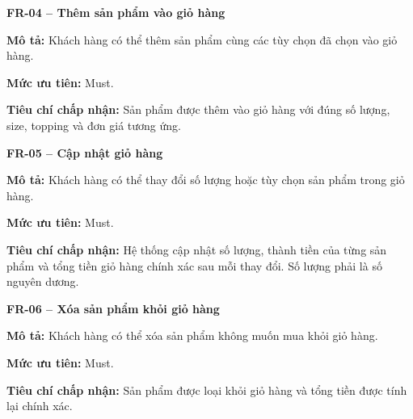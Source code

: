 \documentclass[a4paper]{article}
\begin{document}
\par\ifdim\dimexpr\pagegoal-\pagetotal\relax<6\baselineskip\newpage\fi
{}

\noindent\textbf{FR-04 – Thêm sản phẩm vào giỏ hàng}\par\nopagebreak
\begin{list}{}{%
    \setlength{\leftmargin}{0.8cm}%
    \setlength{\rightmargin}{0pt}%
    \setlength{\labelwidth}{0pt}%
    \setlength{\labelsep}{0pt}%
    \setlength{\itemindent}{0pt}%
    \setlength{\listparindent}{0pt}%
    \setlength{\itemsep}{5pt}%
    \setlength{\parsep}{0pt}%
    \setlength{\topsep}{5pt}%
}
\item[] \textbf{Mô tả:} Khách hàng có thể thêm sản phẩm cùng các tùy chọn đã chọn vào giỏ hàng.
\item[] \textbf{Mức ưu tiên:} Must.
\item[] \textbf{Tiêu chí chấp nhận:} Sản phẩm được thêm vào giỏ hàng với đúng số lượng, size, topping và đơn giá tương ứng.
\end{list}

\par\ifdim\dimexpr\pagegoal-\pagetotal\relax<6\baselineskip\newpage\fi
{}

\noindent\textbf{FR-05 – Cập nhật giỏ hàng}\par\nopagebreak
\begin{list}{}{%
    \setlength{\leftmargin}{0.8cm}%
    \setlength{\rightmargin}{0pt}%
    \setlength{\labelwidth}{0pt}%
    \setlength{\labelsep}{0pt}%
    \setlength{\itemindent}{0pt}%
    \setlength{\listparindent}{0pt}%
    \setlength{\itemsep}{5pt}%
    \setlength{\parsep}{0pt}%
    \setlength{\topsep}{5pt}%
}
\item[] \textbf{Mô tả:} Khách hàng có thể thay đổi số lượng hoặc tùy chọn sản phẩm trong giỏ hàng.
\item[] \textbf{Mức ưu tiên:} Must.
\item[] \textbf{Tiêu chí chấp nhận:} Hệ thống cập nhật số lượng, thành tiền của từng sản phẩm và tổng tiền giỏ hàng chính xác sau mỗi thay đổi. Số lượng phải là số nguyên dương.
\end{list}

\par\ifdim\dimexpr\pagegoal-\pagetotal\relax<6\baselineskip\newpage\fi
{}

\noindent\textbf{FR-06 – Xóa sản phẩm khỏi giỏ hàng}\par\nopagebreak
\begin{list}{}{%
    \setlength{\leftmargin}{0.8cm}%
    \setlength{\rightmargin}{0pt}%
    \setlength{\labelwidth}{0pt}%
    \setlength{\labelsep}{0pt}%
    \setlength{\itemindent}{0pt}%
    \setlength{\listparindent}{0pt}%
    \setlength{\itemsep}{5pt}%
    \setlength{\parsep}{0pt}%
    \setlength{\topsep}{5pt}%
}
\item[] \textbf{Mô tả:} Khách hàng có thể xóa sản phẩm không muốn mua khỏi giỏ hàng.
\item[] \textbf{Mức ưu tiên:} Must.
\item[] \textbf{Tiêu chí chấp nhận:} Sản phẩm được loại khỏi giỏ hàng và tổng tiền được tính lại chính xác.
\end{list}
\end{document}
